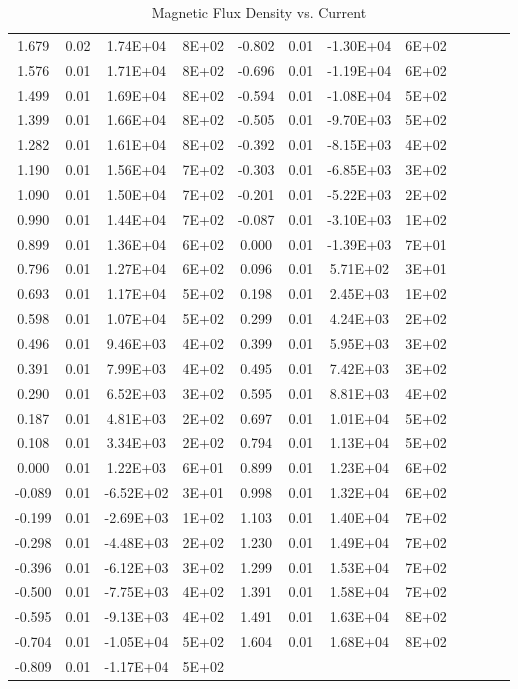 \begin{enumerate}[resume]
\begin{table}
\begin{tabular}{|c|c|c|c|c|c|c|c|c|c|c|c|}
      1.679&0.02&1.74E+04&8E+02&-0.802&0.01&-1.30E+04&6E+02\\
      1.576&0.01&1.71E+04&8E+02&-0.696&0.01&-1.19E+04&6E+02\\
      1.499&0.01&1.69E+04&8E+02&-0.594&0.01&-1.08E+04&5E+02\\
      1.399&0.01&1.66E+04&8E+02&-0.505&0.01&-9.70E+03&5E+02\\
      1.282&0.01&1.61E+04&8E+02&-0.392&0.01&-8.15E+03&4E+02\\
      1.190&0.01&1.56E+04&7E+02&-0.303&0.01&-6.85E+03&3E+02\\
      1.090&0.01&1.50E+04&7E+02&-0.201&0.01&-5.22E+03&2E+02\\
      0.990&0.01&1.44E+04&7E+02&-0.087&0.01&-3.10E+03&1E+02\\
      0.899&0.01&1.36E+04&6E+02&0.000&0.01&-1.39E+03&7E+01\\
      0.796&0.01&1.27E+04&6E+02&0.096&0.01&5.71E+02&3E+01\\
      0.693&0.01&1.17E+04&5E+02&0.198&0.01&2.45E+03&1E+02\\
      0.598&0.01&1.07E+04&5E+02&0.299&0.01&4.24E+03&2E+02\\
      0.496&0.01&9.46E+03&4E+02&0.399&0.01&5.95E+03&3E+02\\
      0.391&0.01&7.99E+03&4E+02&0.495&0.01&7.42E+03&3E+02\\
      0.290&0.01&6.52E+03&3E+02&0.595&0.01&8.81E+03&4E+02\\
      0.187&0.01&4.81E+03&2E+02&0.697&0.01&1.01E+04&5E+02\\
      0.108&0.01&3.34E+03&2E+02&0.794&0.01&1.13E+04&5E+02\\
      0.000&0.01&1.22E+03&6E+01&0.899&0.01&1.23E+04&6E+02\\
      -0.089&0.01&-6.52E+02&3E+01&0.998&0.01&1.32E+04&6E+02\\
      -0.199&0.01&-2.69E+03&1E+02&1.103&0.01&1.40E+04&7E+02\\
      -0.298&0.01&-4.48E+03&2E+02&1.230&0.01&1.49E+04&7E+02\\
      -0.396&0.01&-6.12E+03&3E+02&1.299&0.01&1.53E+04&7E+02\\
      -0.500&0.01&-7.75E+03&4E+02&1.391&0.01&1.58E+04&7E+02\\
      -0.595&0.01&-9.13E+03&4E+02&1.491&0.01&1.63E+04&8E+02\\
      -0.704&0.01&-1.05E+04&5E+02&1.604&0.01&1.68E+04&8E+02\\
      -0.809&0.01&-1.17E+04&5E+02&&&&\\
      \hline
    \end{tabular}
    \label{tbl:HMTable3}
    \caption{Magnetic Flux Density vs. Current}
  \end{table}




\end{enumerate}
